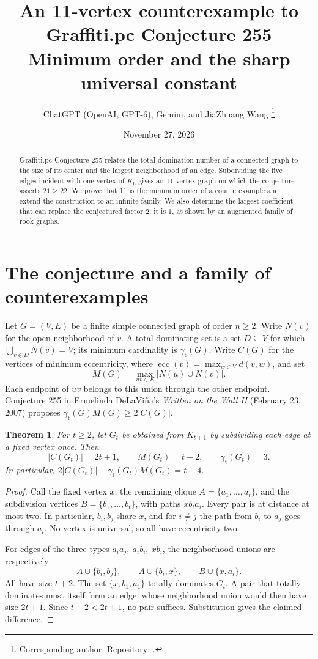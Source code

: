 \documentclass[10pt]{article}
\title{An 11-vertex counterexample to Graffiti.pc Conjecture 255\\
  \large Minimum order and the sharp universal constant}
\author{ChatGPT (OpenAI, GPT-6), Gemini, and JiaZhuang Wang%
  \thanks{Corresponding author. Repository:
  \repourl.}}
\date{November 27, 2026}
\newtheorem{theorem}{Theorem}
\newcommand{\gtot}{\gamma_{\mathrm t}}
\newcommand{\ec}{\operatorname{ecc}}
\begin{document}
\maketitle
\begin{abstract}
Graffiti.pc Conjecture 255 relates the total domination number of a connected
graph to the size of its center and the largest neighborhood of an edge.
Subdividing the five edges incident with one vertex of \(K_6\) gives an
11-vertex graph on which the conjecture asserts \(21\ge22\).
We prove that 11 is the minimum order of a counterexample and extend the
construction to an infinite family. We also determine the largest coefficient
that can replace the conjectured factor \(2\): it is \(1\), as shown by an
augmented family of rook graphs.
\end{abstract}

\section{The conjecture and a family of counterexamples}
Let \(G=(V,E)\) be a finite simple connected graph of order \(n\ge2\).
Write \(N(v)\) for the open neighborhood of \(v\). A total dominating set
is a set \(D\subseteq V\) for which \(\bigcup_{v\in D}N(v)=V\);
its minimum cardinality is \(\gtot(G)\). Write \(C(G)\) for the vertices
of minimum eccentricity, where \(\ec(v)=\max_{w\in V}d(v,w)\), and set
\[
 M(G)=\max_{uv\in E}|N(u)\cup N(v)|.
\]
Each endpoint of \(uv\) belongs to this union through the other endpoint.
Conjecture 255 in Ermelinda DeLaVi\~na's \emph{Written on the Wall II}
(February 23, 2007) proposes \(\gtot(G)M(G)\ge 2|C(G)|\).

\begin{theorem}
For \(t\ge2\), let \(G_t\) be obtained from \(K_{t+1}\) by subdividing
each edge at a fixed vertex once. Then
\[
 |C(G_t)|=2t+1,\qquad M(G_t)=t+2,\qquad \gtot(G_t)=3.
\]
In particular, \(2|C(G_t)|-\gtot(G_t)M(G_t)=t-4\).
\end{theorem}
\begin{proof}
Call the fixed vertex \(x\), the remaining clique \(A=\{a_1,\ldots,a_t\}\),
and the subdivision vertices \(B=\{b_1,\ldots,b_t\}\), with paths
\(x b_i a_i\). Every pair is at distance at most two. In particular,
\(b_i,b_j\) share \(x\), and for \(i\ne j\) the path from \(b_i\) to \(a_j\)
goes through \(a_i\). No vertex is universal, so all have eccentricity two.

For edges of the three types \(a_i a_j,\ a_i b_i,\ xb_i\), the neighborhood
unions are respectively
\[
 A\cup\{b_i,b_j\},\qquad A\cup\{b_i,x\},\qquad B\cup\{x,a_i\}.
\]
All have size \(t+2\). The set \(\{x,b_1,a_1\}\) totally dominates \(G_t\).
A pair that totally dominates must itself form an edge, whose neighborhood
union would then have size \(2t+1\). Since \(t+2<2t+1\), no pair suffices.
Substitution gives the claimed difference.
\end{proof}
\end{document}
